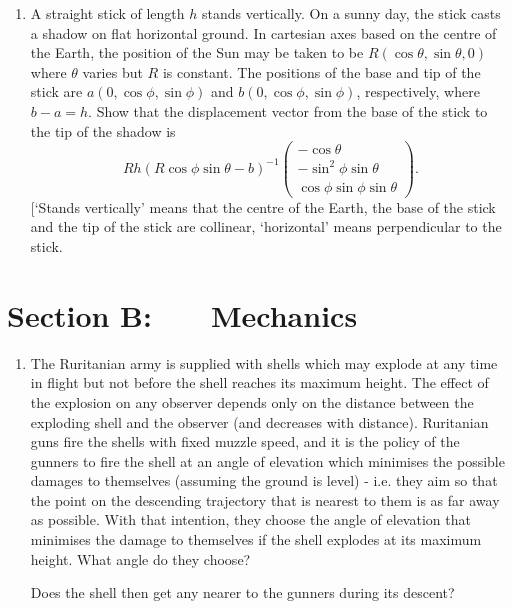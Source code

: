 \documentclass[a4, 11pt]{report}
\newlength{\qspace}
\newcounter{qnumber}
\newenvironment{question}%
 {\vspace{\qspace}
  \begin{enumerate}[\bfseries 1\quad][10]%
    \setcounter{enumi}{\value{qnumber}}%
    \item%
 }
{
  \end{enumerate}
  \filbreak
  \stepcounter{qnumber}
 }
\begin{document}
		
			
		\begin{question} A straight stick of length $h$ stands vertically. On a sunny day,
the stick casts a shadow on flat horizontal ground. In cartesian axes
based on the centre of the Earth, the position of the Sun may be taken
to be $R(\cos\theta,\sin\theta,0)$ where $\theta$ varies but $R$
is constant. The positions of the base and tip of the stick are $a(0,\cos\phi,\sin\phi)$
and $b(0,\cos\phi,\sin\phi)$, respectively, where $b-a=h$. Show
that the displacement vector from the base of the stick to the tip
of the shadow is 
\[
Rh(R\cos\phi\sin\theta-b)^{-1}\begin{pmatrix}-\cos\theta\\
-\sin^{2}\phi\sin\theta\\
\cos\phi\sin\phi\sin\theta
\end{pmatrix}.
\]
{[}`Stands vertically' means that the centre of the Earth, the base
of the stick and the tip of the stick are collinear, `horizontal'
means perpendicular to the stick. 
\end{question}
		
	
\newpage
\section*{Section B: \ \ \ Mechanics}


	
\begin{question}
	The Ruritanian army is supplied with shells which may explode at any
	time in flight but not before the shell reaches its maximum height.
	The effect of the explosion on any observer depends only on the distance
	between the exploding shell and the observer (and decreases with distance).
	Ruritanian guns fire the shells with fixed muzzle speed, and it is
	the policy of the gunners to fire the shell at an angle of elevation
	which minimises the possible damages to themselves (assuming the ground
	is level) - i.e. they aim so that the point on the descending trajectory
	that is nearest to them is as far away as possible. With that intention,
	they choose the angle of elevation that minimises the damage to themselves
	if the shell explodes at its maximum height. What angle do they choose? 


	Does the shell then get any nearer to the gunners during its descent?
	\end{question}
	
\end{document}
